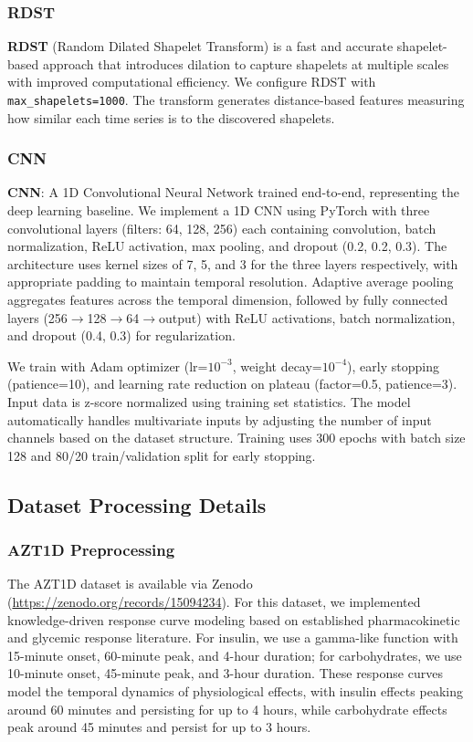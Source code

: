 \documentclass[times, review, 10pt]{elsarticle}
\begin{document}
\subsubsection{RDST}
\textbf{RDST} \cite{guillaume2022random} (Random Dilated Shapelet Transform) is a fast and accurate shapelet-based approach that introduces dilation to capture 
shapelets at multiple scales with improved computational efficiency.
We configure RDST with \texttt{max\_shapelets=1000}. The transform generates distance-based features measuring how similar each time series is to the discovered shapelets.

\subsubsection{CNN}
\textbf{CNN}: A 1D Convolutional Neural Network trained end-to-end, representing the deep learning baseline.
We implement a 1D CNN using PyTorch with three convolutional layers (filters: 64, 128, 256) each containing convolution, batch normalization, ReLU
activation, max pooling, and dropout (0.2, 0.2, 0.3). The architecture uses kernel sizes of 7, 5, and 3 for the three layers
respectively, with appropriate padding to maintain temporal resolution. Adaptive average pooling aggregates features across the temporal dimension,
followed by fully connected layers (256$\rightarrow$128$\rightarrow$64$\rightarrow$output) with ReLU activations, batch normalization, and dropout (0.4, 0.3) for regularization.

We train with Adam optimizer (lr=$10^{-3}$, weight decay=$10^{-4}$), early stopping (patience=10), and learning rate reduction on plateau (factor=0.5, patience=3).
Input data is z-score normalized using training set statistics. The model automatically handles multivariate inputs by adjusting the number of input channels 
based on the dataset structure. Training uses 300 epochs with batch size 128 and 80/20 train/validation split for early stopping.

\subsection{Dataset Processing Details}
\label{sec:dataset_processing}

\subsubsection{AZT1D Preprocessing}

The AZT1D dataset is available via Zenodo (\url{https://zenodo.org/records/15094234}).
For this dataset, we implemented knowledge-driven response curve modeling based on established pharmacokinetic and glycemic response literature.
For insulin, we use a gamma-like function with 15-minute onset, 60-minute peak,
and 4-hour duration; for carbohydrates, we use 10-minute onset, 45-minute peak, and 3-hour duration.
These response curves model the temporal dynamics of physiological effects,
with insulin effects peaking around 60 minutes and persisting for up to 4
hours, while carbohydrate effects peak around 45 minutes and persist for up to
3 hours.
\end{document}
